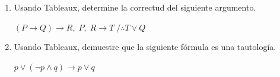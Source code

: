 \documentclass[letterpaper,11pt]{article}
\begin{document}
\begin{enumerate}
    \item Usando Tableaux, determine la correctud del siguiente argumento.

    \begin{center}
        $(P → Q) → R, \; P, \; R → T \; /∴ T \lor Q$
    \end{center}

    \item Usando Tableaux, demuestre que la siguiente fórmula es una tautología.

    \begin{center}
        $p \lor (\neg p \land q) → p \lor q$
    \end{center}
\end{enumerate}
\end{document}
